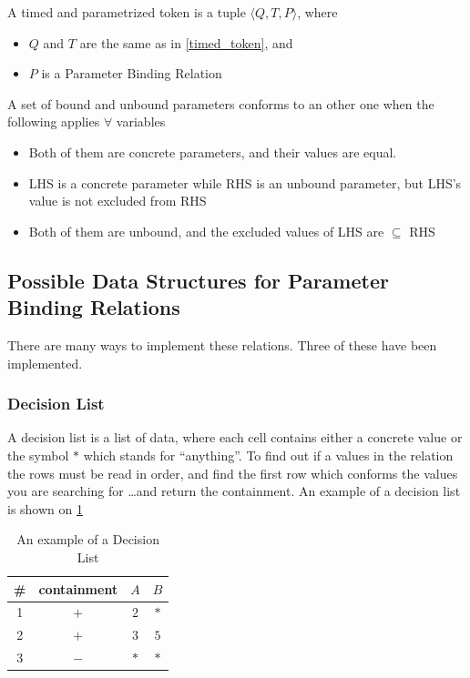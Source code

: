 \begin{dfn}
	A timed and parametrized token is a tuple $\langle Q,T,P \rangle$, where 
	\begin{itemize}
		\item $Q$ and $T$ are the same as in \cref{timed_token}, and 
		\item $P$ is a Parameter Binding Relation
	\end{itemize}
\end{dfn}

\begin{dfn}
	A set of bound and unbound parameters conforms to an other one when the following applies $\forall$ variables
	\begin{itemize}
		\item Both of them are concrete parameters, and their values are equal.
		\item LHS is a concrete parameter while RHS is an unbound parameter, but LHS's value is not excluded from RHS
		\item Both of them are unbound, and the excluded values of LHS are $\subseteq$ RHS
	\end{itemize}
\end{dfn}
	
\subsection{Possible Data Structures for Parameter Binding Relations}

There are many ways to implement these relations. Three of these have been implemented.

\subsubsection{Decision List}

A decision list is a list of data, where each cell contains either a concrete value or the symbol $\ast$ which stands
for ``anything''. To find out if a values in the relation the rows must be read in order, and find the first row which conforms the values you are searching for  \dots and return the containment.
An example of a decision list is shown on \cref{tab:cep:decision_list}

\begin{table}
	\centering
	\caption{An example of a Decision List}		
	\label{tab:cep:decision_list}
	\begin{tabular}{cccc}
		\toprule
		\# & containment & $A$ & $B$ \\
		\midrule
		1 & $+$ & $2$ & $\ast$\\
		2 & $+$ & $3$ & $5$ \\
		3 & $-$ & $\ast$ & $\ast$ \\
		\bottomrule
	\end{tabular}
\end{table}

